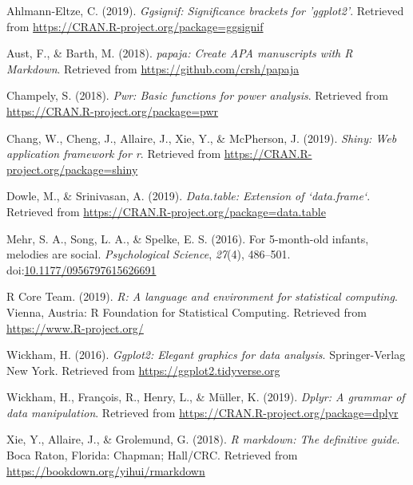 \documentclass[man,floatsintext]{apa6}
\begin{document}
\begingroup
\setlength{\parindent}{-0.5in} \setlength{\leftskip}{0.5in}

\hypertarget{refs}{}
\hypertarget{ref-R-ggsignif}{}
Ahlmann-Eltze, C. (2019). \emph{Ggsignif: Significance brackets for
'ggplot2'}. Retrieved from
\url{https://CRAN.R-project.org/package=ggsignif}

\hypertarget{ref-R-papaja}{}
Aust, F., \& Barth, M. (2018). \emph{papaja: Create APA manuscripts with
R Markdown}. Retrieved from \url{https://github.com/crsh/papaja}

\hypertarget{ref-R-pwr}{}
Champely, S. (2018). \emph{Pwr: Basic functions for power analysis}.
Retrieved from \url{https://CRAN.R-project.org/package=pwr}

\hypertarget{ref-R-shiny}{}
Chang, W., Cheng, J., Allaire, J., Xie, Y., \& McPherson, J. (2019).
\emph{Shiny: Web application framework for r}. Retrieved from
\url{https://CRAN.R-project.org/package=shiny}

\hypertarget{ref-R-data.table}{}
Dowle, M., \& Srinivasan, A. (2019). \emph{Data.table: Extension of
`data.frame`}. Retrieved from
\url{https://CRAN.R-project.org/package=data.table}

\hypertarget{ref-Mehr_Song_Spelke_2016}{}
Mehr, S. A., Song, L. A., \& Spelke, E. S. (2016). For 5-month-old
infants, melodies are social. \emph{Psychological Science},
\emph{27}(4), 486--501.
doi:\href{https://doi.org/10.1177/0956797615626691}{10.1177/0956797615626691}

\hypertarget{ref-R-base}{}
R Core Team. (2019). \emph{R: A language and environment for statistical
computing}. Vienna, Austria: R Foundation for Statistical Computing.
Retrieved from \url{https://www.R-project.org/}

\hypertarget{ref-R-ggplot2}{}
Wickham, H. (2016). \emph{Ggplot2: Elegant graphics for data analysis}.
Springer-Verlag New York. Retrieved from
\url{https://ggplot2.tidyverse.org}

\hypertarget{ref-R-dplyr}{}
Wickham, H., François, R., Henry, L., \& Müller, K. (2019). \emph{Dplyr:
A grammar of data manipulation}. Retrieved from
\url{https://CRAN.R-project.org/package=dplyr}

\hypertarget{ref-R-rmarkdown}{}
Xie, Y., Allaire, J., \& Grolemund, G. (2018). \emph{R markdown: The
definitive guide}. Boca Raton, Florida: Chapman; Hall/CRC. Retrieved
from \url{https://bookdown.org/yihui/rmarkdown}

\endgroup
\end{document}
